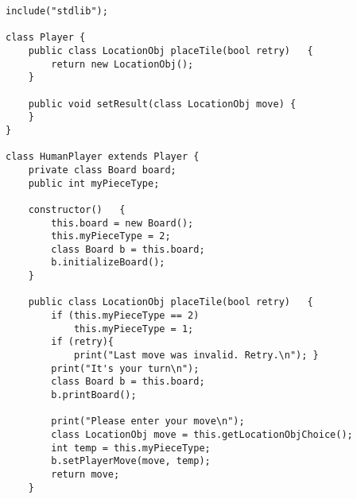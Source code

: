 \documentclass{plt}
\begin{document}
\begin{frame}[fragile]
\fontsize{6pt}{6pt}\selectfont
\begin{verbatim}
include("stdlib");

class Player {
    public class LocationObj placeTile(bool retry)   {
        return new LocationObj();
    }

    public void setResult(class LocationObj move) { 
    }
}

class HumanPlayer extends Player {
    private class Board board;
    public int myPieceType;

    constructor()   {
        this.board = new Board();
        this.myPieceType = 2;
        class Board b = this.board;
        b.initializeBoard();
    }

    public class LocationObj placeTile(bool retry)   {
        if (this.myPieceType == 2)
            this.myPieceType = 1;
        if (retry){
            print("Last move was invalid. Retry.\n"); }
        print("It's your turn\n");
        class Board b = this.board;
        b.printBoard();

        print("Please enter your move\n");
        class LocationObj move = this.getLocationObjChoice();
        int temp = this.myPieceType;
        b.setPlayerMove(move, temp);
        return move;
    }
\end{verbatim}
\end{frame}
\end{document}
